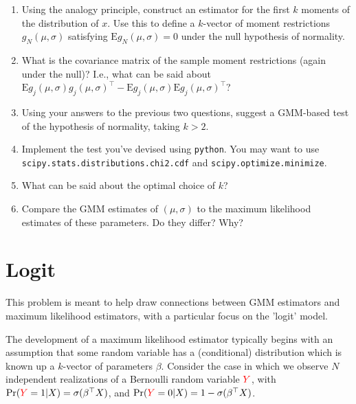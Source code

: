 \documentclass[12pt]{amsart}
\newcommand{\T}{\top}
\newcommand{\rv}[1]{\ensuremath{\textcolor{red}{#1}{}}}
\begin{document}
\begin{enumerate}
\item Using the analogy principle, construct an estimator for the first
\(k\) moments of the distribution of \(x\).  Use this to define a
\(k\)-vector of moment restrictions \(g_N(\mu,\sigma)\) satisfying
\(\mbox{E} g_N(\mu,\sigma) = 0\) under the null hypothesis of normality.
\item What is the covariance matrix of the sample moment restrictions
(again under the null)?
I.e., what can be said about \(\mbox{E} g_j(\mu,\sigma) g_j(\mu,\sigma)^\T - \mbox{E} g_j(\mu,\sigma) \mbox{E} g_j(\mu,\sigma)^\T\)?
\item Using your answers to the previous two questions, suggest a
GMM-based test of the hypothesis of normality, taking \(k>2\).
\item Implement the test you've devised using \texttt{python}.  You may want
to use \texttt{scipy.stats.distributions.chi2.cdf} and \texttt{scipy.optimize.minimize}.
\item What can be said about the optimal choice of \(k\)?
\item Compare the GMM estimates of \((\mu,\sigma)\) to the maximum
likelihood estimates of these parameters.  Do they differ?  Why?
\end{enumerate}
\section{Logit}
\label{sec:org37b277d}
This problem is meant to help draw connections between GMM estimators and maximum likelihood estimators, with a particular focus on the 'logit' model.  

The development of a maximum likelihood estimator typically begins with an assumption that some random variable has a (conditional) distribution which is known up a \(k\)-vector of parameters \(\beta\).
Consider the case in which we observe \(N\) independent realizations of a Bernoulli random variable \(\rv{Y}\), with \(\mbox{Pr}(\rv{Y}=1|X) = \sigma(\beta^\T X)\), and \(\mbox{Pr}(\rv{Y}=0|X) = 1-\sigma(\beta^\T X)\).
\end{document}
